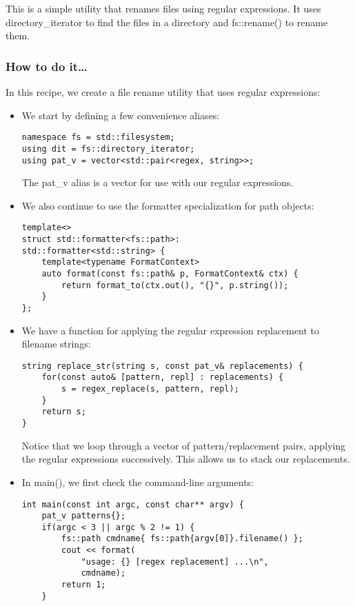 

This is a simple utility that renames files using regular expressions. It uses directory\_iterator to find the files in a directory and fs::rename() to rename them.

\subsubsection{How to do it…}

In this recipe, we create a file rename utility that uses regular expressions:

\begin{itemize}
\item 
We start by defining a few convenience aliases:

\begin{lstlisting}[style=styleCXX]
namespace fs = std::filesystem;
using dit = fs::directory_iterator;
using pat_v = vector<std::pair<regex, string>>;
\end{lstlisting}

The pat\_v alias is a vector for use with our regular expressions.

\item 
We also continue to use the formatter specialization for path objects:

\begin{lstlisting}[style=styleCXX]
template<>
struct std::formatter<fs::path>:
std::formatter<std::string> {
	template<typename FormatContext>
	auto format(const fs::path& p, FormatContext& ctx) {
		return format_to(ctx.out(), "{}", p.string());
	}
};
\end{lstlisting}

\item 
We have a function for applying the regular expression replacement to filename strings:

\begin{lstlisting}[style=styleCXX]
string replace_str(string s, const pat_v& replacements) {
	for(const auto& [pattern, repl] : replacements) {
		s = regex_replace(s, pattern, repl);
	}
	return s;
}
\end{lstlisting}

Notice that we loop through a vector of pattern/replacement pairs, applying the regular expressions successively. This allows us to stack our replacements.

\item 
In main(), we first check the command-line arguments:

\begin{lstlisting}[style=styleCXX]
int main(const int argc, const char** argv) {
	pat_v patterns{};
	if(argc < 3 || argc % 2 != 1) {
		fs::path cmdname{ fs::path{argv[0]}.filename() };
		cout << format(
			"usage: {} [regex replacement] ...\n",
			cmdname);
		return 1;
	}
\end{lstlisting}


\end{itemize}
